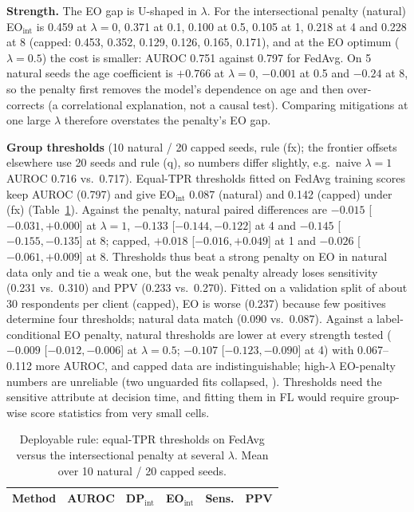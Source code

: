 \textbf{Strength.} The EO gap is U-shaped in $\lambda$. For the intersectional penalty (natural) EO$_\text{int}$ is 0.459 at $\lambda{=}0$, 0.371 at 0.1, 0.100 at 0.5, 0.105 at 1, 0.218 at 4 and 0.228 at 8 (capped: 0.453, 0.352, 0.129, 0.126, 0.165, 0.171), and at the EO optimum ($\lambda{=}0.5$) the cost is smaller: AUROC 0.751 against 0.797 for FedAvg. On 5 natural seeds the age coefficient is $+0.766$ at $\lambda{=}0$, $-0.001$ at 0.5 and $-0.24$ at 8, so the penalty first removes the model's dependence on age and then over-corrects (a correlational explanation, not a causal test). Comparing mitigations at one large $\lambda$ therefore overstates the penalty's EO gap.

\textbf{Group thresholds} (10 natural / 20 capped seeds, rule (fx); the frontier offsets elsewhere use 20 seeds and rule (q), so numbers differ slightly, e.g.\ naive $\lambda{=}1$ AUROC 0.716 vs.\ 0.717). Equal-TPR thresholds fitted on FedAvg training scores keep AUROC (0.797) and give EO$_\text{int}$ 0.087 (natural) and 0.142 (capped) under (fx) (Table~\ref{tab:thr}). Against the penalty, natural paired differences are $-0.015$ [$-0.031,+0.000$] at $\lambda{=}1$, $-0.133$ [$-0.144,-0.122$] at 4 and $-0.145$ [$-0.155,-0.135$] at 8; capped, $+0.018$ [$-0.016,+0.049$] at 1 and $-0.026$ [$-0.061,+0.009$] at 8. Thresholds thus beat a strong penalty on EO in natural data only and tie a weak one, but the weak penalty already loses sensitivity (0.231 vs.\ 0.310) and PPV (0.233 vs.\ 0.270). Fitted on a validation split of about 30 respondents per client (capped), EO is worse (0.237) because few positives determine four thresholds; natural data match (0.090 vs.\ 0.087). Against a label-conditional EO penalty, natural thresholds are lower at every strength tested ($-0.009$ [$-0.012,-0.006$] at $\lambda{=}0.5$; $-0.107$ [$-0.123,-0.090$] at 4) with 0.067--0.112 more AUROC, and capped data are indistinguishable; high-$\lambda$ EO-penalty numbers are unreliable (two unguarded fits collapsed, ). Thresholds need the sensitive attribute at decision time, and fitting them in FL would require group-wise score statistics from very small cells.

\begin{table}[t]
\centering
\caption{Deployable rule: equal-TPR thresholds on FedAvg versus the intersectional penalty at several $\lambda$. Mean over 10 natural / 20 capped seeds.}
\label{tab:thr}
\scriptsize
\setlength{\tabcolsep}{3pt}
\begin{tabular}{lccccc}
\toprule
Method & AUROC & DP$_\text{int}$ & EO$_\text{int}$ & Sens. & PPV\\
\midrule

\bottomrule
\end{tabular}
\end{table}

